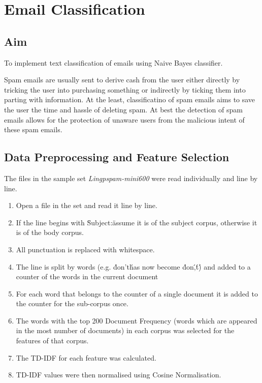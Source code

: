 \documentclass[10pt, a4paper]{article}
\begin{document}
\section{Email Classification}

\subsection*{Aim}

To implement text classification of emails using Naive Bayes classifier.

Spam emails are usually sent to derive cash from the user either directly by tricking the user into purchasing something or indirectly by ticking them into parting with information. At the least, classificatino of spam emails aims to save the user the time and hassle of deleting spam. At best the detection of spam emails allows for the protection of unaware users from the malicious intent of these spam emails.

\subsection*{Data Preprocessing and Feature Selection}
The files in the sample set \emph{Lingpspam-mini600} were read individually and line by line.
\begin{enumerate}
\item Open a file in the set and read it line by line.
\item If the line begins with \"Subject:\" assume it is of the subject corpus, otherwise it is of the body corpus.
\item All punctuation is replaced with whitespace.
\item The line is split by words (e.g. \'don't\' has now become \'don\',\'t\') and added to a counter of the words in the current document
\item For each word that belongs to the counter of a single document it is added to the counter for the sub-corpus once.
\item The words with the top 200 Document Frequency (words which are appeared in the most number of documents) in each corpus was selected for the features of that corpus.
\item The TD-IDF for each feature was calculated.
\item TD-IDF values were then normalised using Cosine Normalisation.
\end{enumerate}
\end{document}

